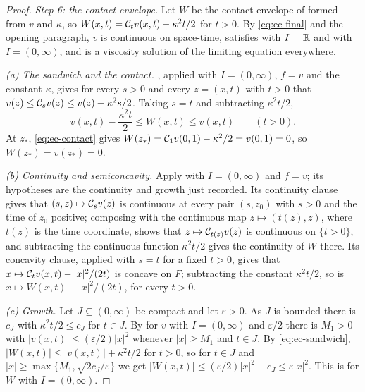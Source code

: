 \begin{proof}
\emph{Step 6: the contact envelope.}
Let $W$ be the contact envelope of  formed from $v$ and
$\kappa$, so $W(x,t)=\mathcal{C}_tv(x,t)-\kappa^2t/2$ for $t>0$. By
\eqref{eq:ec-final} and the opening paragraph, $v$ is continuous on space-time,
satisfies  with $I=\mathbb{R}$ and with $I=(0,\infty)$, and
is a viscosity solution of the limiting equation everywhere.

\emph{(a) The sandwich and the contact.} , applied with
$I=(0,\infty)$, $f=v$ and the constant $\kappa$, gives for every $s>0$ and every
$z=(x,t)$ with $t>0$ that $v(z)\le\mathcal{C}_sv(z)\le v(z)+\kappa^2s/2$. Taking
$s=t$ and subtracting $\kappa^2t/2$,
\begin{equation}\label{eq:ec-sandwich}
  v(x,t)-\frac{\kappa^2t}{2}\le W(x,t)\le v(x,t)\qquad(t>0).
\end{equation}
At $z_*$, \eqref{eq:ec-contact} gives
$W(z_*)=\mathcal{C}_1v(0,1)-\kappa^2/2=v(0,1)=0$, so $W(z_*)=v(z_*)=0$.

\emph{(b) Continuity and semiconcavity.} Apply  with
$I=(0,\infty)$ and $f=v$; its hypotheses are the continuity and growth just
recorded. Its continuity clause gives that
$(s,z)\mapsto\mathcal{C}_sv(z)$ is continuous at every pair $(s,z_0)$ with $s>0$ and
the time of $z_0$ positive; composing with the continuous map
$z\mapsto(t(z),z)$, where $t(z)$ is the time coordinate, shows that
$z\mapsto\mathcal{C}_{t(z)}v(z)$ is continuous on $\{t>0\}$, and subtracting the
continuous function $\kappa^2t/2$ gives the continuity of $W$ there. Its
concavity clause, applied with $s=t$ for a fixed $t>0$, gives that
$x\mapsto\mathcal{C}_tv(x,t)-|x|^2/(2t)$ is concave on $F$; subtracting the constant
$\kappa^2t/2$, so is $x\mapsto W(x,t)-|x|^2/(2t)$, for every $t>0$.

\emph{(c) Growth.} Let $J\subseteq(0,\infty)$ be compact and let
$\varepsilon>0$. As $J$ is bounded there is $c_J$ with $\kappa^2t/2\le c_J$ for
$t\in J$. By  for $v$ with $I=(0,\infty)$ and
$\varepsilon/2$ there is $M_1>0$ with $|v(x,t)|\le(\varepsilon/2)|x|^2$ whenever
$|x|\ge M_1$ and $t\in J$. By \eqref{eq:ec-sandwich},
$|W(x,t)|\le|v(x,t)|+\kappa^2t/2$ for $t>0$, so for $t\in J$ and
$|x|\ge\max\{M_1,\sqrt{2c_J/\varepsilon}\}$ we get
$|W(x,t)|\le(\varepsilon/2)|x|^2+c_J\le\varepsilon|x|^2$. This is
 for $W$ with $I=(0,\infty)$.


\end{proof}
